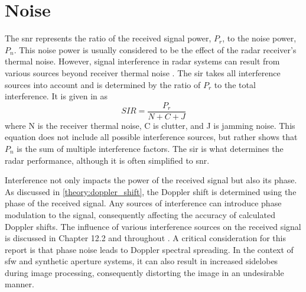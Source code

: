 \documentclass[class=report,11pt,crop=false]{standalone}
\begin{document}
            
\section{Noise} \label{theory:noise}
The \gls{snr} represents the ratio of the received signal power, $P_r$, to the noise power, $P_n$. This noise power is usually considered to be the effect of the radar receiver's thermal noise. %
However, signal interference in radar systems can result from various sources beyond receiver thermal noise \cite{pomr}. The \gls{sir} takes all interference sources into account and is determined by the ratio of $P_r$ to the total interference. It is given in \cite{pomr} as
\begin{equation}\label{eq:sir}
    SIR = \frac{P_r}{N + C + J}
\end{equation}
where N is the receiver thermal noise, C is clutter, and J is jamming noise. This equation does not include all possible interference sources, but rather shows that $P_n$ is the sum of multiple interference factors. The \gls{sir} is what determines the radar performance, although it is often simplified to \gls{snr}.

Interference not only impacts the power of the received signal but also its phase. As discussed in \autoref{theory:doppler_shift}, the Doppler shift is determined using the phase of the received signal. Any sources of interference can introduce phase modulation to the signal, consequently affecting the accuracy of calculated Doppler shifts. The influence of various interference sources on the received signal is discussed in Chapter 12.2 and throughout \cite{pomr}. 
A critical consideration for this report is that phase noise leads to Doppler spectral spreading. In the context of \gls{sfw} and synthetic aperture systems, it can also result in increased sidelobes during image processing, consequently distorting the image in an undesirable manner.%
\end{document}
